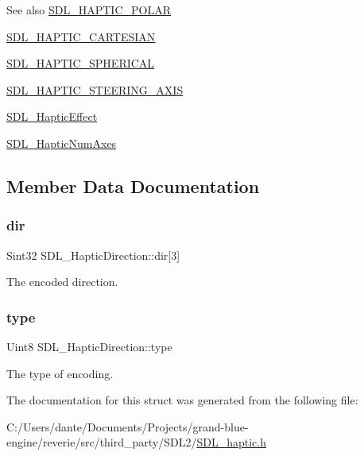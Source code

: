 \begin{DoxySeeAlso}{See also}
\mbox{\hyperlink{_s_d_l__haptic_8h_acdc35e97e5525472054a67b76e518f3b}{S\+D\+L\+\_\+\+H\+A\+P\+T\+I\+C\+\_\+\+P\+O\+L\+AR}} 

\mbox{\hyperlink{_s_d_l__haptic_8h_af8b2430a363a968de2a5b64c8f663d3b}{S\+D\+L\+\_\+\+H\+A\+P\+T\+I\+C\+\_\+\+C\+A\+R\+T\+E\+S\+I\+AN}} 

\mbox{\hyperlink{_s_d_l__haptic_8h_a1fcf7cb0eaf3c39b16ba266054e25aff}{S\+D\+L\+\_\+\+H\+A\+P\+T\+I\+C\+\_\+\+S\+P\+H\+E\+R\+I\+C\+AL}} 

\mbox{\hyperlink{_s_d_l__haptic_8h_a9efacbecc0a1b7a13684ee822b18062c}{S\+D\+L\+\_\+\+H\+A\+P\+T\+I\+C\+\_\+\+S\+T\+E\+E\+R\+I\+N\+G\+\_\+\+A\+X\+IS}} 

\mbox{\hyperlink{union_s_d_l___haptic_effect}{S\+D\+L\+\_\+\+Haptic\+Effect}} 

\mbox{\hyperlink{_s_d_l__haptic_8h_ad6705645197f6df4eeeea32392462483}{S\+D\+L\+\_\+\+Haptic\+Num\+Axes}} 
\end{DoxySeeAlso}


\subsection{Member Data Documentation}
\mbox{\label{struct_s_d_l___haptic_direction_a6cebd8118a3e61e36bd0c503ae020362}} 
\subsubsection{\texorpdfstring{dir}{dir}}
{\footnotesize\ttfamily Sint32 S\+D\+L\+\_\+\+Haptic\+Direction\+::dir\mbox{[}3\mbox{]}}

The encoded direction. \mbox{\label{struct_s_d_l___haptic_direction_acd6830ad68c4ba2af16057fa418087cc}} 
\subsubsection{\texorpdfstring{type}{type}}
{\footnotesize\ttfamily Uint8 S\+D\+L\+\_\+\+Haptic\+Direction\+::type}

The type of encoding. 

The documentation for this struct was generated from the following file\+:\begin{DoxyCompactItemize}
\item 
C\+:/\+Users/dante/\+Documents/\+Projects/grand-\/blue-\/engine/reverie/src/third\+\_\+party/\+S\+D\+L2/\mbox{\hyperlink{_s_d_l__haptic_8h}{S\+D\+L\+\_\+haptic.\+h}}\end{DoxyCompactItemize}
